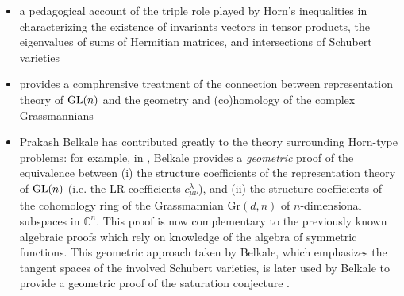 \documentclass[notitlepage, 10pt]{article}
\begin{document}
\begin{itemize}
    \item \citeauthor{berline2018horn} a pedagogical account of the triple role played by Horn's inequalities in characterizing the existence of invariants vectors in tensor products, the eigenvalues of sums of Hermitian matrices, and intersections of Schubert varieties \cite{berline2018horn}
    \item \citeauthor{fulton1997young} provides a comphrensive treatment of the connection between representation theory of $\operatorname{GL}(n)$ and the geometry and (co)homology of the complex Grassmannians \cite{fulton1997young}
    \item Prakash Belkale has contributed greatly to the theory surrounding Horn-type problems: for example, in \cite{belkale2004invariant}, Belkale provides a \textit{geometric} proof of the equivalence between (i) the structure coefficients of the representation theory of $\operatorname{GL}(n)$ (i.e. the LR-coefficients $c_{\mu\nu}^{\lambda}$), and (ii) the structure coefficients of the cohomology ring of the Grassmannian $\mathrm{Gr}(d, n)$ of $n$-dimensional subspaces in $\mathbb C^{n}$. This proof is now complementary to the previously known algebraic proofs which rely on knowledge of the algebra of symmetric functions. This geometric approach taken by Belkale, which emphasizes the tangent spaces of the involved Schubert varieties, is later used by Belkale to provide a geometric proof of the saturation conjecture \cite{belkale2002geometric}.
\end{itemize}
\end{document}
